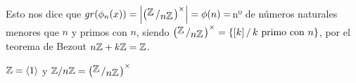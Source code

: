 Esto nos dice que $gr(\phi_n(x)) = \left|\left(\modulo{\bb Z}{n \bb Z}\right)^{\times}\right| = \phi(n) = $nº de n\'umeros naturales menores que $n$ y primos con $n$, siendo $\left(\modulo{\bb Z}{n \bb Z}\right)^{\times} = \{[k] \, / \, k \text{ primo con }n\}$, por el teorema de Bezout $n \mathbb{Z} + k \mathbb{Z} = \mathbb{Z}$. 

$\mathbb{Z} = \langle 1 \rangle$ y $\bb Z / n \bb Z = \left(\modulo{\bb Z}{n \bb Z}\right)^{\times}$
